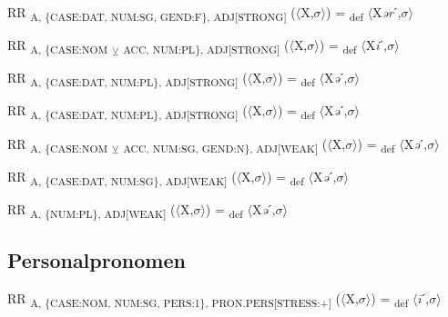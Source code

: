 {\begin{exe}
 RR \textsubscript{A, \{CASE:DAT, NUM:SG, GEND:F\}, ADJ[STRONG]} ($\langle$X,$\sigma $$\rangle$) = \textsubscript{def} $\langle$X\textit{ər}ˊ,$\sigma $$\rangle$
\end{exe}

\begin{exe}
 RR \textsubscript{A, \{CASE:NOM} \textsubscript{${\veebar}$}\textsubscript{ ACC, NUM:PL\}, ADJ[STRONG]} ($\langle$X,$\sigma $$\rangle$) = \textsubscript{def} $\langle$X\textit{i}ˊ,$\sigma $$\rangle$
\end{exe}

\begin{exe}
 RR \textsubscript{A, \{CASE:DAT, NUM:PL\}, ADJ[STRONG]} ($\langle$X,$\sigma $$\rangle$) = \textsubscript{def} $\langle$X\textit{ə}ˊ,$\sigma $$\rangle$
\end{exe}

\begin{exe}
 RR \textsubscript{A, \{CASE:DAT, NUM:PL\}, ADJ[STRONG]} ($\langle$X,$\sigma $$\rangle$) = \textsubscript{def} $\langle$X\textit{ə}ˊ,$\sigma $$\rangle$
\end{exe}

\begin{exe}
 RR \textsubscript{A, \{CASE:NOM} \textsubscript{${\veebar}$}\textsubscript{ ACC, NUM:SG, GEND:N\}, ADJ[WEAK]} ($\langle$X,$\sigma $$\rangle$) = \textsubscript{def} $\langle$X\textit{ə}ˊ,$\sigma $$\rangle$
\end{exe}

\begin{exe}
 RR \textsubscript{A, \{CASE:DAT, NUM:SG\}, ADJ[WEAK]} ($\langle$X,$\sigma $$\rangle$) = \textsubscript{def} $\langle$X\textit{ə}ˊ,$\sigma $$\rangle$
\end{exe}

\begin{exe}
 RR \textsubscript{A, \{NUM:PL\}, ADJ[WEAK]} ($\langle$X,$\sigma $$\rangle$) = \textsubscript{def} $\langle$X\textit{ə}ˊ,$\sigma $$\rangle$
\end{exe}

\subsection{Personalpronomen}

\begin{exe}
 RR \textsubscript{A, \{CASE:NOM, NUM:SG, PERS:1\}, PRON.PERS[STRESS:+]} ($\langle$X,$\sigma $$\rangle$) = \textsubscript{def} $\langle$\textit{\=i}ˊ,$\sigma $$\rangle$
\end{exe}

}
